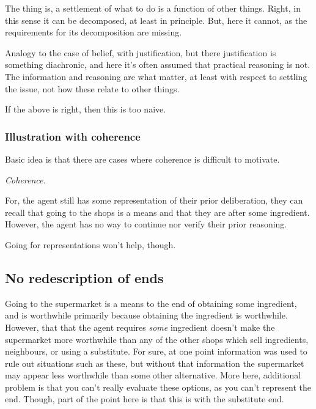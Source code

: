 \documentclass[10pt]{article}
\begin{document}
The thing is, a settlement of what to do is a function of other things.
Right, in this sense it can be decomposed, at least in principle.
But, here it cannot, as the requirements for its decomposition are missing.

Analogy to the case of belief, with justification, but there justification is something diachronic, and here it's often assumed that practical reasoning is not.
The information and reasoning are what matter, at least with respect to settling the issue, not how these relate to other things.

If the above is right, then this is too naive.

\subsubsection{Illustration with coherence}
\label{sec:illustr-with-coher}

Basic idea is that there are cases where coherence is difficult to motivate.




\emph{Coherence.}






For, the agent still has some representation of their prior deliberation, they can recall that going to the shops is a means and that they are after some ingredient.
However, the agent has no way to continue nor verify their prior reasoning.


Going for representations won't help, though.



\subsection{No redescription of ends}
\label{sec:no-redescr-ends}



Going to the supermarket is a means to the end of obtaining some ingredient, and is worthwhile primarily because obtaining the ingredient is worthwhile.
However, that that the agent requires \emph{some} ingredient doesn't make the supermarket more worthwhile than any of the other shops which sell ingredients, neighbours, or using a substitute.
For sure, at one point information was used to rule out situations such as these, but without that information the supermarket may appear less worthwhile than some other alternative.
{\color{red} More here, additional problem is that you can't really evaluate these options, as you can't represent the end.
  Though, part of the point here is that this is with the substitute end.}
\end{document}
